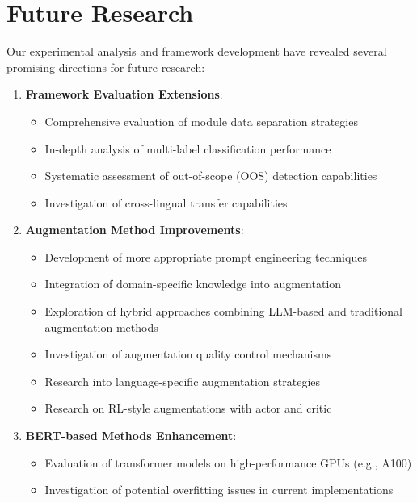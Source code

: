 \section{Future Research}

Our experimental analysis and framework development have revealed several promising directions for future research:

\begin{enumerate}
    \item \textbf{Framework Evaluation Extensions}:
    \begin{itemize}
        \item Comprehensive evaluation of module data separation strategies
        \item In-depth analysis of multi-label classification performance
        \item Systematic assessment of out-of-scope (OOS) detection capabilities
        \item Investigation of cross-lingual transfer capabilities
    \end{itemize}
    
    \item \textbf{Augmentation Method Improvements}:
    \begin{itemize}
        \item Development of more appropriate prompt engineering techniques
        \item Integration of domain-specific knowledge into augmentation
        \item Exploration of hybrid approaches combining LLM-based and traditional augmentation methods
        \item Investigation of augmentation quality control mechanisms
        \item Research into language-specific augmentation strategies
        \item Research on RL-style augmentations with actor and critic
    \end{itemize}
    
    \item \textbf{BERT-based Methods Enhancement}:
    \begin{itemize}
        \item Evaluation of transformer models on high-performance GPUs (e.g., A100)
        \item Investigation of potential overfitting issues in current implementations
    \end{itemize}
    

\end{enumerate}
